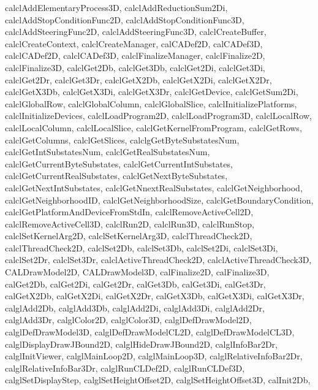 {{    calclAddElementaryProcess3D,
    calclAddReductionSum2Di,
    calclAddStopConditionFunc2D,
    calclAddStopConditionFunc3D,
    calclAddSteeringFunc2D,
    calclAddSteeringFunc3D,
    calclCreateBuffer,
    calclCreateContext,
    calclCreateManager,
    calCADef2D,
    calCADef3D,
    calclCADef2D,
    calclCADef3D,
    calclFinalizeManager,
    calclFinalize2D,
    calclFinalize3D,
    calclGet2Db,
    calclGet3Db,
    calclGet2Di,
    calclGet3Di,
    calclGet2Dr,
    calclGet3Dr,
    calclGetX2Db,
    calclGetX2Di,
    calclGetX2Dr,
    calclGetX3Db,
    calclGetX3Di,
    calclGetX3Dr,
    calclGetDevice,
    calclGetSum2Di,
    calclGlobalRow,
    calclGlobalColumn,
    calclGlobalSlice,
    calclInitializePlatforms,
    calclInitializeDevices,
    calclLoadProgram2D,
    calclLoadProgram3D,
    calclLocalRow,
    calclLocalColumn,
    calclLocalSlice,
    calclGetKernelFromProgram,
    calclGetRows,
    calclGetColumns,
    calclGetSlices,
    calclgGetByteSubstatesNum,
    calclGetIntSubstatesNum,
    calclGetRealSubstatesNum,
    calclGetCurrentByteSubstates,
    calclGetCurrentIntSubstates,
    calclGetCurrentRealSubstates,
    calclGetNextByteSubstates,
    calclGetNextIntSubstates,
    calclGetNnextRealSubstates,
    calclGetNeighborhood,
    calclGetNeighborhoodID,
    calclGetNeighborhoodSize,
    calclGetBoundaryCondition,
    calclGetPlatformAndDeviceFromStdIn,
    calclRemoveActiveCell2D,
    calclRemoveActiveCell3D,
    calclRun2D,
    calclRun3D,
    calclRunStop,
    calclSetKernelArg2D,
    calclSetKernelArg3D,
    calclThreadCheck2D,
    calclThreadCheck2D,
    calclSet2Db,
    calclSet3Db,
    calclSet2Di,
    calclSet3Di,
    calclSet2Dr,
    calclSet3Dr,
    calclActiveThreadCheck2D,
    calclActiveThreadCheck3D,
    CALDrawModel2D,
    CALDrawModel3D,
    calFinalize2D,
    calFinalize3D,
    calGet2Db,
    calGet2Di,
    calGet2Dr,
    calGet3Db,
    calGet3Di,
    calGet3Dr,
    calGetX2Db,
    calGetX2Di,
    calGetX2Dr,
    calGetX3Db,
    calGetX3Di,
    calGetX3Dr,
    calglAdd2Db,
    calglAdd3Db,
    calglAdd2Di,
    calglAdd3Di,
    calglAdd2Dr,
    calglAdd3Dr,
    calglColor2D,
    calglColor3D,
    calglDefDrawModel2D,
    calglDefDrawModel3D,
    calglDefDrawModelCL2D,
    calglDefDrawModelCL3D,
    calglDisplayDrawJBound2D,
    calglHideDrawJBound2D,
    calglInfoBar2Dr,
    calglInitViewer,
    calglMainLoop2D,
    calglMainLoop3D,
    calglRelativeInfoBar2Dr,
    calglRelativeInfoBar3Dr,
    calglRunCLDef2D,
    calglRunCLDef3D,
    calglSetDisplayStep,
    calglSetHeightOffset2D,
    calglSetHeightOffset3D,
    calInit2Db,
}}
